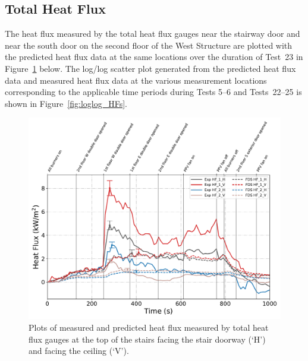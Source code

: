 \clearpage
\subsection{Total Heat Flux}
The heat flux measured by the total heat flux gauges near the stairway door and near the south door on the second floor of the West Structure are plotted with the predicted heat flux data at the same locations over the duration of Test~23 in Figure~\ref{fig:Test23_HFs} below. The log/log scatter plot generated from the predicted heat flux data and measured heat flux data at the various measurement locations corresponding to the applicable time periods during Tests 5--6 and Tests~22--25 is shown in Figure~\ref{fig:loglog_HFs}.  

\begin{figure}[!h]
	\centering
	\includegraphics[width=\columnwidth]{Figures/Plots/Validation/Heat_Flux/Test_23_HFs}
	\caption[Plots of measured and predicted heat flux during Test~23.]{Plots of measured and predicted heat flux measured by total heat flux gauges at the top of the stairs facing the stair doorway (`H') and facing the ceiling (`V').}
	\label{fig:Test23_HFs}
\end{figure}

